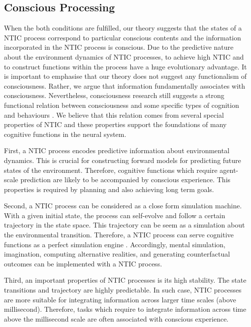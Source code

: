 \documentclass[utf8]{article}
\begin{document}
		\subsection{Conscious Processing}
		When the both conditions are fulfilled, our theory suggests that the states of a NTIC process correspond to particular conscious contents and the information incorporated in the NTIC process is conscious. Due to the predictive nature about the environment dynamics of NTIC processes, to achieve high NTIC and to construct functions within the process have a huge evolutionary advantage. It is important to emphasise that our theory does not suggest any functionalism of consciousness. Rather, we argue that information fundamentally associates with consciousness. Nevertheless, consciousness research still suggests a strong functional relation between consciousness and some specific types of cognition and behaviours \citep{Seth2009Encyclopediaofconsciousness}. We believe that this relation comes from several special properties of NTIC and these properties support the foundations of many cognitive functions in the neural system.
		
		First, a NTIC process encodes predictive information about environmental dynamics. This is crucial for constructing forward models for predicting future states of the environment. Therefore, cognitive functions which require agent-scale prediction are likely to be accompanied by conscious experience. This properties is required by planning and also achieving long term goals.\needref{}
		
		Second, a NTIC process can be considered as a close form simulation machine. With a given initial state, the process can self-evolve and follow a certain trajectory in the state space. This trajectory can be seem as a simulation about the environmental transition. Therefore, a NTIC process can serve cognitive functions as a perfect simulation engine \citep{BERTSCHINGER.2006}. Accordingly, mental simulation, imagination, computing alternative realities, and generating counterfactual outcomes can be implemented with a NTIC process. \needref{}
		
	    Third, an important properties of NTIC processes is its high stability. The state transitions and trajectory are highly predictable. In such case, NTIC processes are more suitable for integrating information across larger time scales (above millisecond). Therefore, tasks which require to integrate information across time above the millisecond scale are often associated with conscious experience. 
	    
\end{document}
